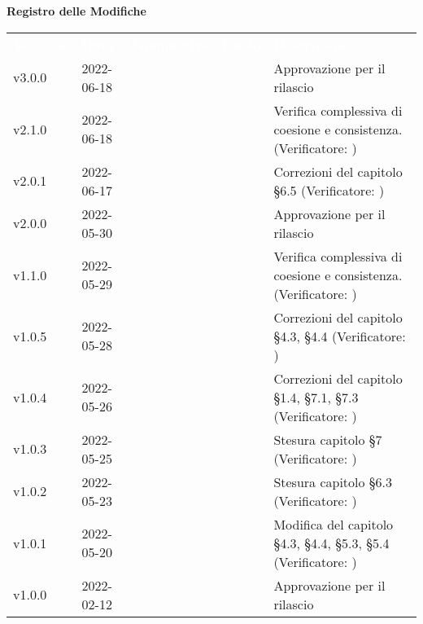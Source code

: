 
{\LARGE{\textbf{Registro delle Modifiche}}} \\
\renewcommand{\arraystretch}{1.5}
\begin{longtable}{ m{}<{\centering}  m{}<{\centering}  m{}<{\centering}  m{}<{\centering}  m{}<{\centering} }
	\rowcolor{darkblue}
	\textcolor{white}{\textbf{Versione}} &\textcolor{white}{\textbf{Data}}& \textcolor{white}{\textbf{Nominativo}} & \textcolor{white}{\textbf{Ruolo}}& \textcolor{white}{\textbf{Descrizione}} \\ 	
	
	v3.0.0& 2022-06-18 & \PV & \RE{}  & Approvazione per il rilascio \\

	v2.1.0& 2022-06-18 & \MB{} & \AM {} & Verifica complessiva di coesione e consistenza. (Verificatore: \textit{\GC})\\

	v2.0.1& 2022-06-17 & \MB & \AM{} & Correzioni del capitolo §6.5 (Verificatore: \textit{\GC})\\

	v2.0.0& 2022-05-30 & \PV & \RE{}  & Approvazione per il rilascio \\

	v1.1.0& 2022-05-29 & \MB{} & \AM {} & Verifica complessiva di coesione e consistenza. (Verificatore: \textit{\MG})\\

	v1.0.5& 2022-05-28 & \EP & \AM{} & Correzioni del capitolo §4.3, §4.4 (Verificatore: \textit{\GC})\\

	v1.0.4& 2022-05-26 & \MB & \AM{} & Correzioni del capitolo §1.4, §7.1, §7.3 (Verificatore: \textit{\GC})\\

	v1.0.3& 2022-05-25 & \MB & \AM{} & Stesura capitolo §7 (Verificatore: \textit{\GC})\\

	v1.0.2& 2022-05-23 & \EP & \AM{} & Stesura capitolo §6.3 (Verificatore: \textit{\GC})\\

	v1.0.1& 2022-05-20 & \EP & \AM{} & Modifica del capitolo §4.3, §4.4, §5.3, §5.4 (Verificatore:  \textit{\GC})\\	
	
	v1.0.0& 2022-02-12 & \GC & \RE{}  & Approvazione per il rilascio\\


\end{longtable}
